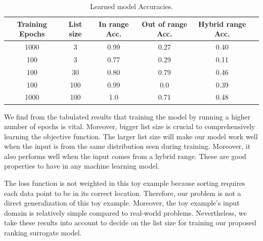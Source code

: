 \documentclass[12pt, twoside, ngerman]{report}
\begin{document}
\begin{table} [h!]
\centering
\resizebox{\linewidth}{!} {
\begin{tabular}{ | c | c | c | c | c | c | }
\hline
\textbf{Training Epochs} & \textbf{List size} & \textbf{In range Acc.} & \textbf{Out of range Acc.} & \textbf{Hybrid range Acc.} \\ [0.5 ex]
\hline \hline
1000 & 3 & 0.99 & 0.27 & 0.40\\
100 & 3  & 0.77 & 0.29 & 0.11\\
100 & 30  & 0.80 & 0.79 & 0.46\\
100 & 100  & 0.99 & 0.0 & 0.39\\
1000 & 100  & 1.0 & 0.71 & 0.48\\
\hline
\end{tabular}
}
\caption{Learned model Accuracies.}
\label {table:caseStudyResults}
\end{table}

We find from the tabulated results that training the model by running a higher number of epochs is vital.
Moreover, bigger list size is crucial to comprehensively learning the objective function.
The larger list size will make our model work well when the input is from the same distribution seen during training.
Moreover,  it also performs well when the input comes from a hybrid range.
These are good properties to have in any machine learning model.

The loss function is not weighted in this toy example because sorting requires each data point to be in its correct location.
Therefore,  our problem is not a direct generalization of this toy example.
Moreover, the toy example's input domain is relatively simple compared to real-world problems.
Nevertheless,  we take these results into account to decide on the list size for training our proposed ranking surrogate model.



\iffalse
\end{document}
